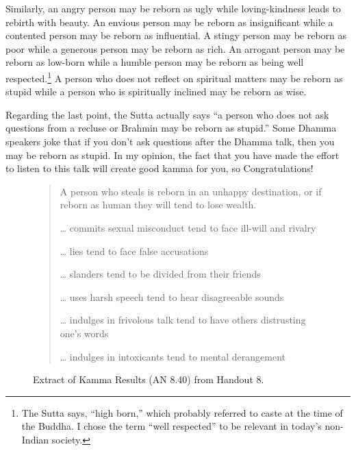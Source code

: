 Similarly, an angry person may be reborn as ugly while loving-kindness leads to rebirth with beauty. An envious person may be reborn as insignificant while a contented person may be reborn as influential. A stingy person may be reborn as poor while a generous person may be reborn as rich. An arrogant person may be reborn as low-born while a humble person may be reborn as being well respected.\footnote{The Sutta says, “high born,” which probably referred to caste at the time of the Buddha. I chose the term “well respected” to be relevant in today’s non-Indian society.} A person who does not reflect on spiritual matters may be reborn as stupid while a person who is spiritually inclined may be reborn as wise.

Regarding the last point, the Sutta actually says “a person who does not ask questions from a recluse or Brahmin may be reborn as stupid.” Some Dhamma speakers joke that if you don’t ask questions after the Dhamma talk, then you may be reborn as stupid. In my opinion, the fact that you have made the effort to listen to this talk will create good kamma for you, so Congratulations! \smiley 

\begin{figure}[H]
\begin{quotation}
A person who steals is reborn in an unhappy destination, or if reborn as human they will tend to lose wealth.

… commits sexual misconduct \textrightarrow \hspace{1mm} tend to face ill-will and rivalry

… lies \textrightarrow \hspace{1mm} tend to face false accusations

… slanders \textrightarrow \hspace{1mm} tend to be divided from their friends

… uses harsh speech \textrightarrow \hspace{1mm} tend to hear disagreeable sounds

… indulges in frivolous talk \textrightarrow \hspace{1mm} tend to have others distrusting one’s words

… indulges in intoxicants \textrightarrow \hspace{1mm} tend to mental derangement
\end{quotation}
\caption{Extract of Kamma Results (AN 8.40) from Handout 8.}
\label{fig:AN3}
\end{figure}

